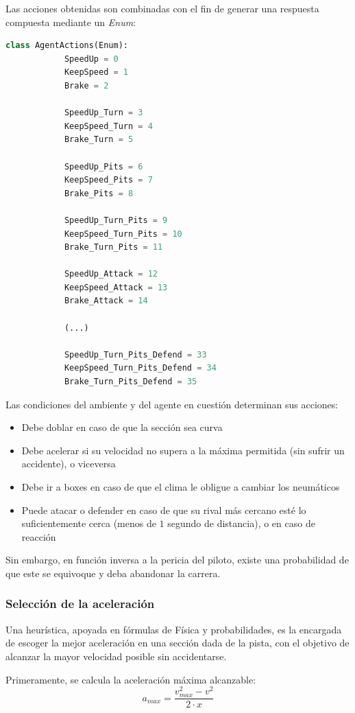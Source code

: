 \documentclass[12pt, letterpaper,spanish]{article}
\theoremstyle{definition}
\theoremstyle{remark}
\begin{document}
		Las acciones obtenidas son combinadas con el fin de generar una respuesta compuesta mediante un \emph{Enum}:	
		\begin{lstlisting}[language={Python}, label={Script}]
		class AgentActions(Enum):
		    SpeedUp = 0
		    KeepSpeed = 1
		    Brake = 2
		
		    SpeedUp_Turn = 3
		    KeepSpeed_Turn = 4
		    Brake_Turn = 5
		
		    SpeedUp_Pits = 6
		    KeepSpeed_Pits = 7
		    Brake_Pits = 8
		
		    SpeedUp_Turn_Pits = 9
		    KeepSpeed_Turn_Pits = 10
		    Brake_Turn_Pits = 11
		
		    SpeedUp_Attack = 12
		    KeepSpeed_Attack = 13
		    Brake_Attack = 14
		
		    (...)
		
		    SpeedUp_Turn_Pits_Defend = 33
		    KeepSpeed_Turn_Pits_Defend = 34
		    Brake_Turn_Pits_Defend = 35
		\end{lstlisting}

		Las condiciones del ambiente y del agente en cuestión determinan sus acciones:
		\begin{itemize}
			\item Debe doblar en caso de que la sección sea curva
			\item Debe acelerar si su velocidad no supera a la máxima permitida (sin sufrir un accidente), o viceversa
			\item Debe ir a boxes en caso de que el clima le obligue a cambiar los neumáticos
			\item Puede atacar o defender en caso de que su rival más cercano esté lo suficientemente cerca (menos de $1$ segundo de distancia), o en caso de reacción
		\end{itemize}

		Sin embargo, en función inversa a la pericia del piloto, existe una probabilidad de que este se equivoque y deba abandonar la carrera.
		
	
		\subsubsection{Selección de la aceleración}
		Una heurística, apoyada en fórmulas de Física y probabilidades, es la encargada de escoger la mejor aceleración en una sección dada de la pista, con el objetivo de alcanzar la mayor velocidad posible sin accidentarse. 

		Primeramente, se calcula la aceleración máxima alcanzable:
		\begin{equation}\label{eq:a_max}
		a_{max}=\frac{v_{max}^{2} - v^{2}}{2 \cdot x}
		\end{equation}
\end{document}

